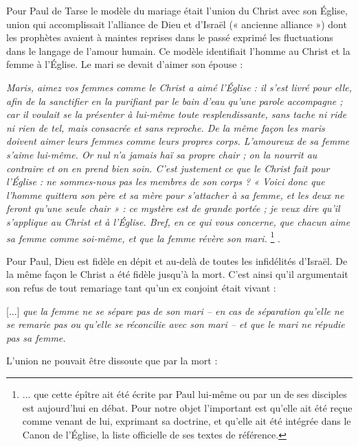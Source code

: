  Pour Paul de Tarse le modèle du mariage était l'union du Christ avec son Église, union qui accomplissait l'alliance de Dieu et d'Israël (« ancienne alliance ») dont les prophètes avaient à maintes reprises dans le passé exprimé les fluctuations dans le langage de l'amour humain. Ce modèle identifiait l'homme au Christ et la femme à l'Église. Le mari se devait d'aimer son épouse :

\begin{displayquote}[Eph. 5,25-33]
\emph{Maris, aimez vos femmes comme le Christ a aimé l'Église : il s'est livré pour elle, afin de la sanctifier en la purifiant par le bain d'eau qu'une parole accompagne ; car il voulait se la présenter à lui-même toute resplendissante, sans tache ni ride ni rien de tel, mais consacrée et sans reproche. De la même façon les maris doivent aimer leurs femmes comme leurs propres corps. L'amoureux de sa femme s'aime lui-même. Or nul n'a jamais haï sa propre chair ; on la nourrit au contraire et on en prend bien soin. C'est justement ce que le Christ fait pour l'Église : ne sommes-nous pas les membres de son corps ? « Voici donc que l'homme quittera son père et sa mère pour s'attacher à sa femme, et les deux ne feront qu'une seule chair » : ce mystère est de grande portée ; je veux dire qu'il s'applique au Christ et à l'Église. Bref, en ce qui vous concerne, que chacun aime sa femme comme soi-même, et que la femme révère son mari.}%
\footnote{... que cette épître ait été écrite par Paul lui-même ou par un de ses disciples est aujourd'hui en débat. Pour notre objet l'important est qu'elle ait été reçue comme venant de lui, exprimant sa doctrine, et qu'elle ait été intégrée dans le Canon de l'Église, la liste officielle de ses textes de référence.}%
.
\end{displayquote}

 Pour Paul, Dieu est fidèle en dépit et au-delà de toutes les infidélités d'Israël. De la même façon le Christ a été fidèle jusqu'à la mort. C'est ainsi qu'il argumentait son refus de tout remariage tant qu'un ex conjoint était vivant :

\begin{displayquote}[I Cor 7,10-12]

[...] \emph{que la femme ne se sépare pas de son mari -- en cas de séparation qu'elle ne se remarie pas ou qu'elle se réconcilie avec son mari -- et que le mari ne répudie pas sa femme.}
\end{displayquote}

L'union ne pouvait être dissoute que par la mort :

